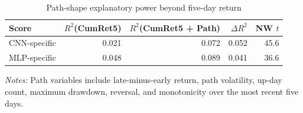 \begin{table}[htbp]
\centering
\caption{Path-shape explanatory power beyond five-day return}
\label{tab:recent_pathshape}
\begin{tabular}{lrrrr}
\toprule
Score & $R^2$(CumRet5) & $R^2$(CumRet5 + Path) & $\Delta R^2$ & NW $t$ \\
\midrule
CNN-specific & 0.021 & 0.072 & 0.052 & 45.6 \\
MLP-specific & 0.048 & 0.089 & 0.041 & 36.6 \\
\bottomrule
\end{tabular}
\begin{minipage}{0.92\linewidth}
\footnotesize
\textit{Notes:} Path variables include late-minus-early return, path volatility, up-day count, maximum drawdown, reversal, and monotonicity over the most recent five days.
\end{minipage}
\end{table}
